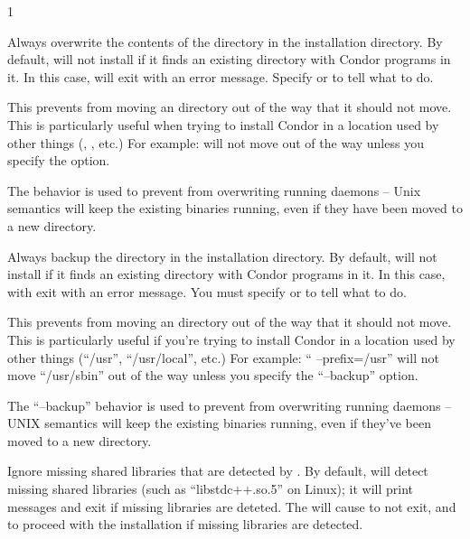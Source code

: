 \begin{ManPage}{\label{man-condor-configure}}{1}
\begin{Options}
	 {
	  Always overwrite the contents of the  directory in
	  the installation directory.  By default, 
	  will not install if it finds an existing  directory
	  with Condor programs in it.  In this case, 
	  will exit with an error message.  Specify
	   or  to tell 
	  what to do.

	  This prevents  from moving an 
	  directory out of the way that it should not move.  This is
	  particularly useful when trying to install Condor in a
	  location used by other things (, , etc.)
	  For example:  
          will not move
	   out of the way unless you specify the
	   option.

	  The  behavior is used to
	  prevent  from overwriting running daemons --
	  Unix semantics will keep the existing binaries running, even
	  if they have been moved to a new directory.}

	 {
	  Always backup the  directory in the installation
	  directory.  By default,  will not install if
	  it finds an existing  directory with Condor programs
	  in it.  In this case,  with exit with an
	  error message.  You must specify  or
	   to tell  what to do.

	  This prevents  from moving an 
	  directory out of the way that it should not move.  This is
	  particularly useful if you're trying to install Condor in a
	  location used by other things (``/usr'', ``/usr/local'', etc.)
	  For example: `` --prefix=/usr'' will not move
	  ``/usr/sbin'' out of the way unless you specify the
	  ``--backup'' option.

	  The ``--backup'' behavior is used to
	  prevent  from overwriting running daemons --
	  UNIX semantics will keep the existing binaries running, even
	  if they've been moved to a new directory. }

	 {
	  Ignore missing shared libraries that are detected by
	  .  By default,  will detect
	  missing shared libraries (such as ``libstdc++.so.5'' on
	  Linux); it will print messages and exit if missing libraries
	  are deteted.  The  will cause
	   to not exit, and to proceed with the
	  installation if missing libraries are detected.
	}


\end{Options}
\end{ManPage}
